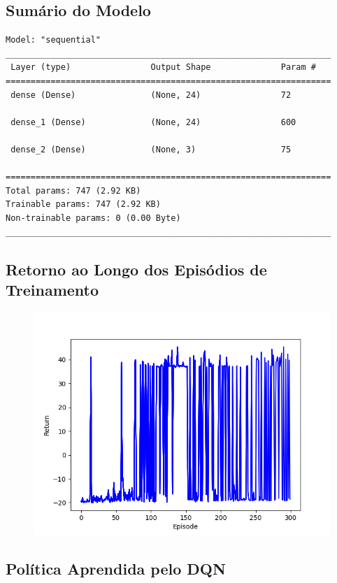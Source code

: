 \documentclass[a4paper,12pt]{article}
\begin{document}
\subsection{Sumário do Modelo}
\begin{verbatim}
Model: "sequential"
_________________________________________________________________
 Layer (type)                Output Shape              Param #   
=================================================================
 dense (Dense)               (None, 24)                72        
                                                                 
 dense_1 (Dense)             (None, 24)                600       
                                                                 
 dense_2 (Dense)             (None, 3)                 75        
                                                                 
=================================================================
Total params: 747 (2.92 KB)
Trainable params: 747 (2.92 KB)
Non-trainable params: 0 (0.00 Byte)
_________________________________________________________________
\end{verbatim}

\subsection{Retorno ao Longo dos Episódios de Treinamento}

\begin{figure}[!h]
    \centering
    \includegraphics[width=0.6\linewidth]{dqn_training.png}
\end{figure}

\subsection{Política Aprendida pelo DQN}
\end{document}
